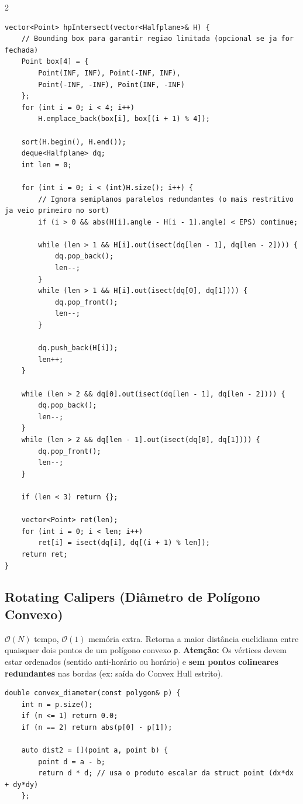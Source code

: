 \documentclass[11pt]{article}
\begin{document}
\begin{multicols}{2}
\begin{lstlisting}
vector<Point> hpIntersect(vector<Halfplane>& H) {
    // Bounding box para garantir regiao limitada (opcional se ja for fechada)
    Point box[4] = {
        Point(INF, INF), Point(-INF, INF),
        Point(-INF, -INF), Point(INF, -INF)
    };
    for (int i = 0; i < 4; i++)
        H.emplace_back(box[i], box[(i + 1) % 4]);

    sort(H.begin(), H.end());
    deque<Halfplane> dq;
    int len = 0;

    for (int i = 0; i < (int)H.size(); i++) {
        // Ignora semiplanos paralelos redundantes (o mais restritivo ja veio primeiro no sort)
        if (i > 0 && abs(H[i].angle - H[i - 1].angle) < EPS) continue;

        while (len > 1 && H[i].out(isect(dq[len - 1], dq[len - 2]))) {
            dq.pop_back();
            len--;
        }
        while (len > 1 && H[i].out(isect(dq[0], dq[1]))) {
            dq.pop_front();
            len--;
        }

        dq.push_back(H[i]);
        len++;
    }

    while (len > 2 && dq[0].out(isect(dq[len - 1], dq[len - 2]))) {
        dq.pop_back();
        len--;
    }
    while (len > 2 && dq[len - 1].out(isect(dq[0], dq[1]))) {
        dq.pop_front();
        len--;
    }

    if (len < 3) return {};

    vector<Point> ret(len);
    for (int i = 0; i < len; i++)
        ret[i] = isect(dq[i], dq[(i + 1) % len]);
    return ret;
}
\end{lstlisting}

\subsection{Rotating Calipers (Diâmetro de Polígono Convexo)}
$\mathcal{O}(N)$ tempo, $\mathcal{O}(1)$ memória extra. Retorna a maior distância euclidiana entre quaisquer dois pontos de um polígono convexo \texttt{p}. \textbf{Atenção:} Os vértices devem estar ordenados (sentido anti-horário ou horário) e \textbf{sem pontos colineares redundantes} nas bordas (ex: saída do Convex Hull estrito).
\begin{lstlisting}
double convex_diameter(const polygon& p) {
    int n = p.size();
    if (n <= 1) return 0.0;
    if (n == 2) return abs(p[0] - p[1]);

    auto dist2 = [](point a, point b) {
        point d = a - b;
        return d * d; // usa o produto escalar da struct point (dx*dx + dy*dy)
    };


\end{lstlisting}
\end{multicols}
\end{document}
